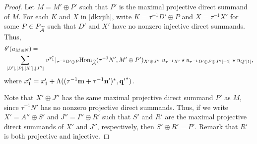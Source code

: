 \documentclass[reqno,12pt]{amsart}
\numberwithin{equation}{section}
\theoremstyle{plain} %
\theoremstyle{definition} %
\begin{document}
\begin{proof}
Let $M=M'\oplus P'$ such that $P'$ is the maximal projective direct summand of $M$. For each $K$ and $X$ in \eqref{dkxjih}, write $K=\tau^{-1} D'\oplus P$ and $X=\tau^{-1} X'$ for some $P\in P_{\widetilde{\mathcal{A}}}$ such that $D'$ and $X'$ have no nonzero injective direct summands. Thus,
\begin{equation*}
\begin{split}
&\theta'(u_{M\oplus N})=\\&\sum\limits_{\begin{smallmatrix}[D'],[P],[X'],[J'']\end{smallmatrix}}v^{x''_1}|_{\tau^{-1} D'\oplus P}\mbox{\rm Hom}_{\widetilde{\mathcal{A}}}(\tau^{-1} N',M'\oplus P')_{X'\oplus J''}|u_{\tau^{-1} X'}\star u_{\tau^{-1} D'\oplus P\oplus J''[-1]}\star u_{Q'[1]},
\end{split}
\end{equation*}
where $x''_1=x'_1+\Lambda((\tau^{-1}{\bf m}+\tau^{-1}{\bf n}')^\ast,{{\bf q}'}^\ast)$.

Note that $X'\oplus J''$ has the same maximal projective direct summand $P'$ as $M$, since $\tau^{-1}N'$ has no nonzero projective direct summands.
Thus, if we write $X'=A''\oplus S'$ and $J''=I''\oplus R'$ such that $S'$ and $R'$ are the maximal projective direct summands of $X'$ and $J''$, respectively, then $S'\oplus R'=P'$. Remark that $R'$ is both projective and injective.


\end{proof}
\end{document}
